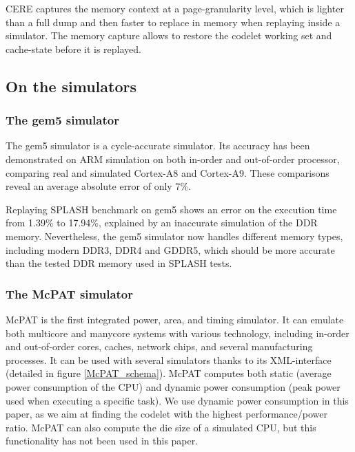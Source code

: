 \documentclass{article}
\begin{document}
\newpage

\begin{multicols}{2}


CERE captures the memory context at a page-granularity level, which is lighter than a full dump and then faster to replace in memory when replaying inside a simulator. The memory capture allows to restore the codelet working set and cache-state before it is replayed. 




\subsection{On the simulators}
\subsubsection*{The gem5 simulator}
The gem5 simulator is a cycle-accurate simulator. Its accuracy has been demonstrated on ARM simulation on both in-order and out-of-order processor, comparing real and simulated Cortex-A8 and Cortex-A9\cite{DBLP:conf/samos/EndoCC14}. These comparisons reveal an average absolute error of only 7\%.

Replaying SPLASH benchmark on gem5 shows an error on the execution time from 1.39\% to 17.94\%, explained by an inaccurate simulation of the DDR memory. Nevertheless, the gem5 simulator now handles different memory types, including modern DDR3, DDR4 and GDDR5, which should be more accurate than the tested DDR memory used in SPLASH tests\cite{DBLP:conf/recosoc/ButkoGOS12}.


\subsubsection*{The McPAT simulator}
McPAT is the first integrated power, area, and timing simulator. It can emulate both multicore and manycore systems with various technology, including in-order and out-of-order cores, caches, network chips, and several manufacturing processes. It can be used with several simulators thanks to its XML-interface (detailed in figure \ref{McPAT_schema}). McPAT computes both static (average power consumption of the CPU) and dynamic power consumption (peak power used when executing a specific task). We use dynamic power consumption in this paper, as we aim at finding the codelet with the highest performance/power ratio.
McPAT can also compute the die size of a simulated CPU, but this functionality has not been used in this paper.



\end{multicols}
\end{document}
